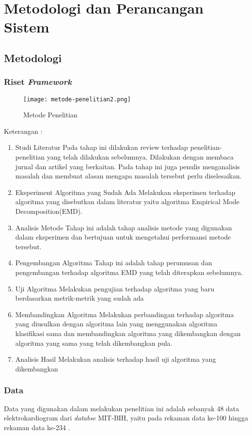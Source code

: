 \chapter{Metodologi dan Perancangan Sistem}
\section{Metodologi}
\subsection{Riset \textit{Framework}}
	\begin{figure}[h!]
		\centering
		\texttt{[image: metode-penelitian2.png]}
		\caption{Metode Penelitian}
		\label{fig:my_method}
	\end{figure}
	
	Keterangan : 
	\begin{enumerate}
	\item Studi Literatur
	 \subitem Pada tahap ini dilakukan review terhadap penelitian-penelitian yang telah dilakukan sebelumnya. Dilakukan dengan membaca jurnal dan artikel yang berkaitan. Pada tahap ini juga penulis menganalisis masalah dan membuat alasan mengapa masalah tersebut perlu diselesaikan.
	\item Eksperiment Algoritma yang Sudah Ada
	\subitem Melakukan eksperimen terhadap algoritma yang disebutkan dalam literatur yaitu algoritma Empirical Mode Decomposition(EMD).
	\item Analisis Metode
	\subitem Tahap ini adalah tahap analisis metode yang digunakan dalam eksperimen dan bertujuan untuk mengetahui performansi metode tersebut.
	\item Pengembangan Algoritma
	\subitem Tahap ini adalah tahap perumusan dan pengembangan terhadap algoritma EMD yang telah diterapkan sebelumnya.
	\item Uji Algoritma
	\subitem Melakukan pengujian terhadap algoritma yang baru berdasarkan metrik-metrik yang sudah ada
	\item Membandingkan Algoritma
	\subitem Melakukan perbandingan terhadap algoritma yang diusulkan dengan algoritma lain yang menggunakan algoritma klasifikasi sama dan membandingkan algoritma yang dikembangkan dengan algoritma yang sama yang telah dikembangkan pula.
	\item Analisis Hasil
	\subitem Melakukan analisis terhadap hasil uji algoritma yang dikembangkan
	
	\end{enumerate}
\subsection{Data}
Data yang digunakan dalam melakukan penelitian ini adalah sebanyak 48 data elektrokardiogram dari \textit{databse} MIT-BIH, yaitu pada rekaman data ke-100 hingga rekaman data ke-234 \cite{mit-bih}.
	

